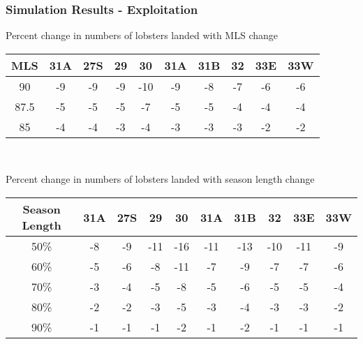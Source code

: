 \documentclass{beamer}
\begin{document}
\begin{frame}
\frametitle{Simulation Results - Exploitation}
Percent change in numbers of lobsters landed with MLS change 
\centering
\begin{tabular}{|c|c|c|c|c|c|c|c|c|c|}
\hline
MLS & 31A & 27S & 29 & 30 & 31A & 31B & 32 & 33E & 33W \\
\hline
90 & -9 & -9 & -9 & -10 & -9 & -8 & -7 & -6 & -6 \\
\hline
87.5 & -5 & -5 & -5 & -7  & -5 & -5 & -4 & -4 & -4 \\
\hline
85 & -4 & -4 & -3 & -4  & -3 & -3 & -3 & -2 & -2 \\
\hline
 
\end{tabular}\\
\vspace{5mm}

Percent change in numbers of lobsters landed with season length change 
\centering
\begin{tabular}{|c|c|c|c|c|c|c|c|c|c|}
\hline
Season Length & 31A & 27S & 29 & 30 & 31A & 31B & 32 & 33E & 33W \\
\hline
50\%   & -8 & -9 & -11 & -16 & -11 & -13 & -10 & -11 & -9 \\
\hline
60\%   & -5 & -6 & -8 & -11 & -7 & -9 & -7 & -7 & -6 \\
\hline
70\%   & -3 & -4 & -5 & -8 & -5 & -6 & -5 & -5 & -4 \\
\hline
80\%   & -2 & -2 & -3 & -5 & -3 & -4 & -3 & -3 & -2 \\
\hline
90\%   & -1 & -1 & -1 & -2 & -1 & -2 & -1 & -1 & -1 \\
\hline
 
\end{tabular}
\end{frame}
\end{document}

